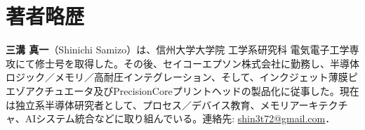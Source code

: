 \documentclass[conference]{IEEEtran}
\begin{document}
\section*{著者略歴}
\textbf{三溝 真一}（Shinichi Samizo）は、信州大学大学院 工学系研究科 電気電子工学専攻にて修士号を取得した。その後、セイコーエプソン株式会社に勤務し、半導体ロジック／メモリ／高耐圧インテグレーション、そして、インクジェット薄膜ピエゾアクチュエータ及びPrecisionCoreプリントヘッドの製品化に従事した。現在は独立系半導体研究者として、プロセス／デバイス教育、メモリアーキテクチャ、AIシステム統合などに取り組んでいる。連絡先: \href{mailto:shin3t72@gmail.com}{shin3t72@gmail.com}．
\end{document}

